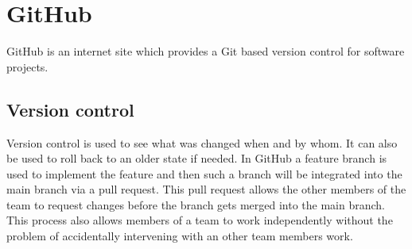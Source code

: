 \section{GitHub}
GitHub \cite{github_url} is an internet site which provides a Git based version control for software projects.
\subsection{Version control}
Version control is used to see what was changed when and by whom. It can also be used to roll back to an older state if needed. In GitHub a feature branch is used to implement the feature and then such a branch will be integrated into the main branch via a pull request. This pull request allows the other members of the team to request changes before the branch gets merged into the main branch. This process also allows members of a team to work independently without the problem of accidentally intervening with an other team members work.